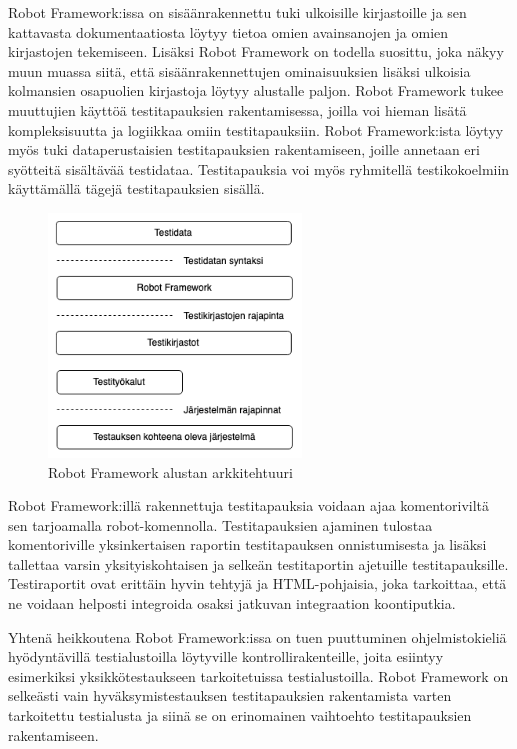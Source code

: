     Robot Framework:issa on sisäänrakennettu tuki ulkoisille kirjastoille ja sen kattavasta dokumentaatiosta löytyy tietoa omien avainsanojen ja omien kirjastojen tekemiseen.
    Lisäksi Robot Framework on todella suosittu, joka näkyy muun muassa siitä, että sisäänrakennettujen ominaisuuksien lisäksi ulkoisia kolmansien osapuolien kirjastoja löytyy alustalle paljon.
    Robot Framework tukee muuttujien käyttöä testitapauksien rakentamisessa, joilla voi hieman lisätä kompleksisuutta ja logiikkaa omiin testitapauksiin.
    Robot Framework:ista löytyy myös tuki dataperustaisien testitapauksien rakentamiseen, joille annetaan eri syötteitä sisältävää testidataa.
    Testitapauksia voi myös ryhmitellä testikokoelmiin käyttämällä tägejä testitapauksien sisällä.

    \begin{figure}[H]
      \centering
      \includegraphics[width=0.6\textwidth]{assets/robot-arkkitehtuuri.png}
      \caption{Robot Framework alustan arkkitehtuuri \parencite{robot_framework_architecture}}
      \label{fig:robot-architecture}
    \end{figure}

    Robot Framework:illä rakennettuja testitapauksia voidaan ajaa komentoriviltä sen tarjoamalla robot-komennolla.
    Testitapauksien ajaminen tulostaa komentoriville yksinkertaisen raportin testitapauksen onnistumisesta ja lisäksi tallettaa varsin yksityiskohtaisen ja selkeän testitaportin ajetuille testitapauksille.
    Testiraportit ovat erittäin hyvin tehtyjä ja HTML-pohjaisia, joka tarkoittaa, että ne voidaan helposti integroida osaksi jatkuvan integraation koontiputkia.

    Yhtenä heikkoutena Robot Framework:issa on tuen puuttuminen ohjelmistokieliä hyödyntävillä testialustoilla löytyville kontrollirakenteille, joita esiintyy esimerkiksi yksikkötestaukseen tarkoitetuissa testialustoilla.
    Robot Framework on selkeästi vain hyväksymistestauksen testitapauksien rakentamista varten tarkoitettu testialusta ja siinä se on erinomainen vaihtoehto testitapauksien rakentamiseen.

